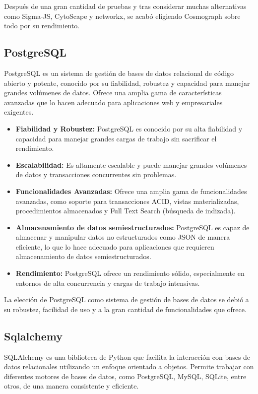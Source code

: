 Después de una gran cantidad de pruebas y tras considerar muchas alternativas como Sigma-JS, CytoScape y networkx, se acabó eligiendo Cosmograph sobre todo por su rendimiento.

\subsection*{PostgreSQL}

PostgreSQL es un sistema de gestión de bases de datos relacional de código abierto y potente, conocido por su fiabilidad, robustez y capacidad para manejar grandes volúmenes de datos. Ofrece una amplia gama de características avanzadas que lo hacen adecuado para aplicaciones web y empresariales exigentes.

\begin{itemize}
	\item \textbf{Fiabilidad y Robustez:} PostgreSQL es conocido por su alta fiabilidad y capacidad para manejar grandes cargas de trabajo sin sacrificar el rendimiento.
	\item \textbf{Escalabilidad:} Es altamente escalable y puede manejar grandes volúmenes de datos y transacciones concurrentes sin problemas.
	\item \textbf{Funcionalidades Avanzadas:} Ofrece una amplia gama de funcionalidades avanzadas, como soporte para transacciones ACID, vistas materializadas, procedimientos almacenados y Full Text Search (búsqueda de indizada).
	\item \textbf{Almacenamiento de datos semiestructurados:} PostgreSQL es capaz de almacenar y manipular datos no estructurados como JSON de manera eficiente, lo que lo hace adecuado para aplicaciones que requieren almacenamiento de datos semiestructurados.
	\item \textbf{Rendimiento:} PostgreSQL ofrece un rendimiento sólido, especialmente en entornos de alta concurrencia y cargas de trabajo intensivas.
\end{itemize}

La elección de PostgreSQL como sistema de gestión de bases de datos se debió a su robustez, facilidad de uso y a la gran cantidad de funcionalidades que ofrece.

\subsection*{Sqlalchemy}
SQLAlchemy es una biblioteca de Python que facilita la interacción con bases de datos relacionales utilizando un enfoque orientado a objetos. Permite trabajar con diferentes motores de bases de datos, como PostgreSQL, MySQL, SQLite, entre otros, de una manera consistente y eficiente.


